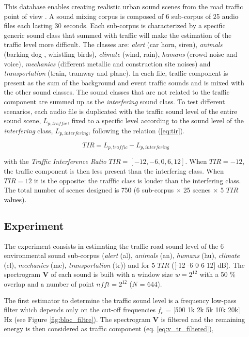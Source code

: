 \documentclass[twocolumn,a4paper,10pt]{article}
\begin{document}
This database enables creating realistic urban sound scenes from the road traffic point of view \cite{gloaguen_creation_2017}. A sound mixing corpus is composed of 6 sub-corpus of 25 audio files each lasting 30 seconds. Each sub-corpus is characterized by a specific generic sound class that summed with traffic will make the estimation of the traffic level more difficult. The classes are: \textit{alert} (car horn, siren), \textit{animals} (barking dog , whistling birds), \textit{climate} (wind, rain), \textit{humans} (crowd noise and voice), \textit{mechanics} (different metallic and construction site noises) and \textit{transportation} (train, tramway and plane). In each file, traffic component is present as the sum of the background and event traffic sounds and is mixed with the other sound classes. The sound classes that are not related to the traffic component are summed up as the \textit{interfering} sound class. To test different scenarios, each audio file is duplicated with the traffic sound level of the entire sound scene, $L_{p,traffic}$, fixed to a specific level according to the sound level of the \textit{interfering} class, $L_{p,interfering}$,  following the relation (\ref{eq:tir}).

\begin{equation}\label{eq:tir}
TIR = L_{p,traffic}-L_{p,interfering}
\end{equation}

with the \textit{Traffic Interference Ratio} $TIR = \left[-12, -6, 0, 6, 12\right]$. When $TIR = -12$, the traffic component is then less present than the interfering class. When $TIR = 12$ it is the opposite: the trafffic class is louder than the interfering class. The total number of scenes designed is 750 (6 sub-corpus $\times$ 25 scenes $\times$  5 $TIR$ values).

\subsection{Experiment}

The experiment consists in estimating the traffic road sound level of the 6 environmental sound sub-corpus (\textit{alert} (al), \textit{animals} (an), \textit{humans} (hu), \textit{climate} (cl), \textit{mechanics} (me), \textit{transportation} (tr)) and for 5 $TIR$ ([-12 -6 0 6 12] dB). The spectrogram $\mathbf{V}$ of each sound is built with a window size $w = 2^{12}$ with a 50 $\%$ overlap and a number of point $nfft = 2^{12}$ ($N$ = 644).

The first estimator to determine the traffic sound level is a frequency low-pass filter which depends only on the cut-off frequencies $f_c$ = [500 1k 2k 5k 10k 20k] Hz (see Figure \ref{fig:bloc_filtre}). The spectrogram $\mathbf{V}$ is filtered and the remaining energy is then considered as traffic component (eq. \ref{eq:v_tr_filtered}),
\end{document}
